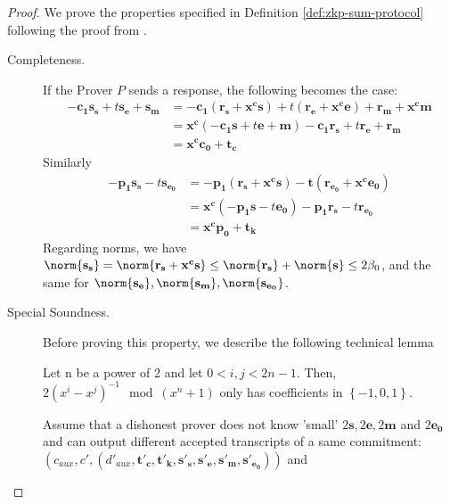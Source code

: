\begin{proof}
  We prove the properties specified in Definition \ref{def:zkp-sum-protocol} following the proof from \cite{benhamouda2014better}.
  \begin{description}
  \item[Completeness.] If the Prover $P$ sends a response, the following becomes the case:
    \begin{align*}
      -\mathbf{c_1s_s} + t\mathbf{s_e} + \mathbf{s_m} &= -\mathbf{c_1(r_s +
                                                        x^cs)} + t(\mathbf{r_e + x^ce}) + \mathbf{r_m + x^cm} \\
                                                      &= \mathbf{x^c}(-\mathbf{c_1s} +t\mathbf{e} + \mathbf{m})
                                                        -\mathbf{c_1r_s} + t\mathbf{r_e} + \mathbf{r_m}\\
                                                      &=\mathbf{x^cc_0} + \mathbf{t_c}
    \end{align*}
    Similarly
    \begin{align*}
      -\mathbf{p_1s_s} -t\mathbf{s_{e_0}} &= -\mathbf{p_1(r_s +
                                            x^cs) - t(\mathbf{r_{e_0} + x^ce_0})}\\
                                          &= \mathbf{x^c}(\mathbf{-p_1s} - t\mathbf{e_0}) -\mathbf{p_1r_s}
                                            -t\mathbf{r_{e_0}} \\
                                          &= \mathbf{x^cp_0 + t_k}
    \end{align*}
    Regarding norms, we have $\norm{\mathbf{s_s}} = \norm{\mathbf{r_s +
        x^cs}} \leq
    \norm{\mathbf{r_s}} + \norm{\mathbf{s}} \leq 2\beta_0$, and
    the same for $\mathbf{\norm{s_e}, \norm{s_m}, \norm{s_{e_0}}}$.
  \item [Special Soundness.] Before proving this property, we describe the
    following technical lemma 
    \begin{lemma}
      Let n be a power of 2 and let $0 <i,j< 2n-1$. Then, $2(x^i -
      x^j)^{-1} \mod (x^n +1)$ only has coefficients in $\left\{ -1,
        0, 1
      \right\}$.
      \label{lem:speicalBinomial}
    \end{lemma}
    Assume that a dishonest prover does not know 'small'
    $2\mathbf{s}, 2\mathbf{e}, 2\mathbf{m}$ and $2\mathbf{e_0}$ and can
    output different accepted transcripts of a same commitment: $(c_{aux}, c',
    (d'_{aux},\mathbf{t'_c, t'_k, s'_s, s'_e, s'_m, s'_{e_0}}))$ and

\end{description}
\end{proof}
